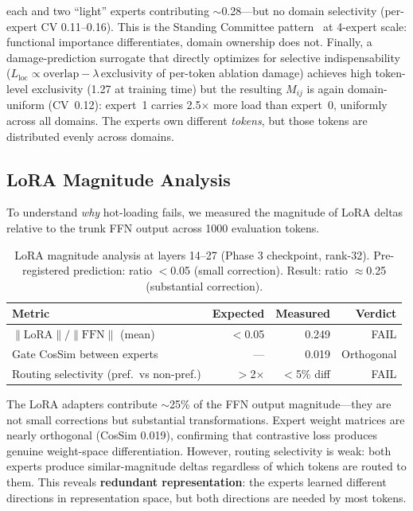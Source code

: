 \documentclass{article}
\begin{document}
each and two ``light'' experts contributing $\sim$0.28---but no domain
selectivity (per-expert CV 0.11--0.16). This is the Standing Committee
pattern~\cite{standing2026} at 4-expert scale: functional importance
differentiates, domain ownership does not. Finally, a damage-prediction
surrogate that directly optimizes for selective indispensability
($L_\text{loc} \propto \text{overlap} - \lambda\,\text{exclusivity}$
of per-token ablation damage) achieves high token-level exclusivity
(1.27 at training time) but the resulting $M_{ij}$ is again
domain-uniform (CV~0.12): expert~1 carries 2.5$\times$ more load than
expert~0, uniformly across all domains. The experts own different
\emph{tokens}, but those tokens are distributed evenly across domains.

\subsection{LoRA Magnitude Analysis}
\label{sec:magnitude}

To understand \emph{why} hot-loading fails, we measured the magnitude of LoRA
deltas relative to the trunk FFN output across 1000 evaluation tokens.

\begin{table}[h]
\centering
\caption{LoRA magnitude analysis at layers 14--27 (Phase 3 checkpoint,
rank-32). Pre-registered prediction: ratio $<$0.05 (small correction).
Result: ratio $\approx$0.25 (substantial correction).}
\label{tab:magnitude}
\begin{tabular}{@{}lrrr@{}}
\toprule
Metric & Expected & Measured & Verdict \\
\midrule
$\|\text{LoRA}\| / \|\text{FFN}\|$ (mean) & $<$0.05 & 0.249 & FAIL \\
Gate CosSim between experts & --- & 0.019 & Orthogonal \\
Routing selectivity (pref.\ vs non-pref.) & $>$2$\times$ & $<$5\% diff & FAIL \\
\bottomrule
\end{tabular}
\end{table}

The LoRA adapters contribute $\sim$25\% of the FFN output magnitude---they
are not small corrections but substantial transformations. Expert weight
matrices are nearly orthogonal (CosSim 0.019), confirming that contrastive
loss produces genuine weight-space differentiation. However, routing
selectivity is weak: both experts produce similar-magnitude deltas regardless
of which tokens are routed to them. This reveals \textbf{redundant representation}: the experts learned different
directions in representation space, but both directions are needed by most
tokens.
\end{document}
